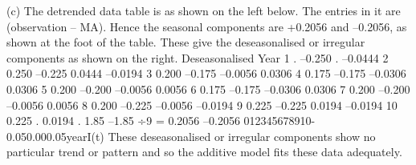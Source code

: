 (c) The detrended data table is as shown on the left below. The entries in it are (observation – MA). Hence the seasonal components are +0.2056 and –0.2056, as shown at the foot of the table. These give the deseasonalised or irregular components as shown on the right.
Deseasonalised
Year 1
.
–0.250
.
–0.0444
2
0.250
–0.225
0.0444
–0.0194
3
0.200
–0.175
–0.0056
0.0306
4
0.175
–0.175
–0.0306
0.0306
5
0.200
–0.200
–0.0056
0.0056
6
0.175
–0.175
–0.0306
0.0306
7
0.200
–0.200
–0.0056
0.0056
8
0.200
–0.225
–0.0056
–0.0194
9
0.225
–0.225
0.0194
–0.0194
10
0.225
.
0.0194
.
1.85
–1.85
÷9 =
0.2056
–0.2056
012345678910-0.050.000.05yearI(t)
These deseasonalised or irregular components show no particular trend or pattern and so the additive model fits these data adequately.

